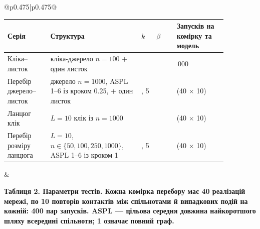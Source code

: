 \documentclass[11pt]{article}
\begin{document}
\begin{longtable}{@{}p{0.475\textwidth}|p{0.475\textwidth}@{}}
\begin{minipage}[t]{\linewidth}
\begin{minipage}{\linewidth}
\small
\setlength{\tabcolsep}{3pt}\begin{tabular}{>{\raggedright\arraybackslash}p{0.17\linewidth}>{\raggedright\arraybackslash}p{0.36\linewidth}>{\raggedright\arraybackslash}p{0.06\linewidth}>{\raggedright\arraybackslash}p{0.08\linewidth}>{\raggedright\arraybackslash}p{0.2\linewidth}}
\toprule
Серія & Структура & $k$ & $\beta$ & Запусків на комірку та модель\\
\midrule
Кліка--листок & кліка-джерело $n=100$ $+$ один листок & 2 & 0.005 & 10\,000\\
Перебір джерело--листок & джерело $n=1000$, ASPL 1--6 із кроком 0.25, $+$ один листок & 1, 5 & 0.003 & 400 (40 $\times$ 10)\\
Ланцюг клік & $L=10$ клік із $n=1000$ & 1 & 0.003 & 400 (40 $\times$ 10)\\
Перебір розміру ланцюга & $L=10$, $n\in\{50,100,250,1000\}$, ASPL 1--6 із кроком 1 & 1, 5 & 0.003 & 400 (40 $\times$ 10)\\
\bottomrule
\end{tabular}
\end{minipage}\par
\end{minipage} &
\begin{minipage}[t]{\linewidth}
\par\noindent\begin{minipage}{\linewidth}
\centering
\par\small\textbf{Таблиця 2. Параметри тестів. Кожна комірка перебору має 40 реалізацій мережі, по 10 повторів контактів між спільнотами й випадкових подій на кожній: 400 пар запусків. ASPL --- цільова середня довжина найкоротшого шляху всередині спільноти; 1 означає повний граф.}


\end{minipage}
\end{minipage}
\end{longtable}
\end{document}
